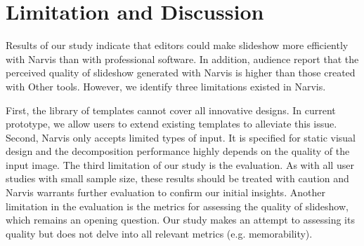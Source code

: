 \section{Limitation and Discussion}

Results of our study indicate that editors could make slideshow more efficiently with Narvis than with professional software. In addition, audience report that the perceived quality of slideshow generated with Narvis is higher than those created with Other tools. However, we identify three limitations existed in Narvis.

First, the library of templates cannot cover all innovative designs. In current prototype, we allow users to extend existing templates to alleviate this issue. 
Second, Narvis only accepts limited types of input. It is specified for static visual design and  the decomposition performance highly depends on the quality of the input image. 
 The third limitation of our study is the evaluation. As with all user studies with small sample size, these results should be treated with caution and Narvis warrants further evaluation to confirm our initial insights. Another limitation in the evaluation is the metrics for assessing the quality of slideshow, which remains an opening question. Our study makes an attempt to assessing its quality but does not delve into all relevant metrics (e.g. memorability).





